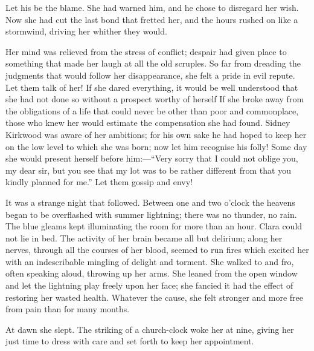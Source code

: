 Let his be the blame. She had warned him, and he chose to disregard her
wish. Now she had cut the last bond that fretted her, and the hours
rushed on like a stormwind, driving her whither they would.

Her mind was relieved from the stress of conflict; despair had given
place to something that made her laugh at all the old scruples. So far
from dreading the judgments that would follow her disappearance, she
felt a pride in evil repute. Let them talk of her! If she dared
everything, it would be well understood that she had not done so without
a prospect worthy of herself If she broke away from the obligations of a
life that could never be other than poor and commonplace, those who knew
her would estimate the compensation she had found. Sidney Kirkwood was
aware of her ambitions; for his {\protect\hypertarget{232}{}{}}own sake
he had hoped to keep her on the low level to which she was born; now let
him recognise his folly! Some day she would present herself before
him:---``Very sorry that I could not oblige you, my dear sir, but you
see that my lot was to be rather different from that you kindly planned
for me.'' Let them gossip and envy!

It was a strange night that followed. Between one and two o'clock the
heavens began to be overflashed with summer lightning; there was no
thunder, no rain. The blue gleams kept illuminating the room for more
than an hour. Clara could not lie in bed. The activity of her brain
became all but delirium; along her nerves, through all the courses of
her blood, seemed to run fires which excited her with an indescribable
mingling of delight and torment. She walked to and fro, often speaking
aloud, throwing up her arms. She leaned from the open window and let the
lightning play freely upon her face; she fancied it had the effect of
restoring her wasted health. Whatever the cause, she felt
{\protect\hypertarget{233}{}{}}stronger and more free from pain than for
many months.

At dawn she slept. The striking of a church-clock woke her at nine,
giving her just time to dress with care and set forth to keep her
appointment.
